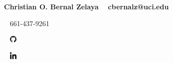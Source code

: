 \documentclass[a4paper, oneside, final]{scrartcl} %
\begin{document}
	\begin{center} %
		\begin{center}
			\Huge\bfseries\hspace*{0.7in} Christian O. Bernal Zelaya
			\newline
			\newline
			\small
			~
			cbernalz@uci.edu
			~
			~
			661-437-9261
			~
			~
			\href{https://github.com/cbernalz}%
				{\includegraphics[width=10pt]{icons/github-mark.png}}%
			~
			~
			\href{https://www.linkedin.com/in/christian-bernal-zelaya-2a410b18a/}%
			{\includegraphics[width=10pt]{icons/linkedin-xxl.png}}%
			~
		\end{center}

\end{center}
\end{document}

